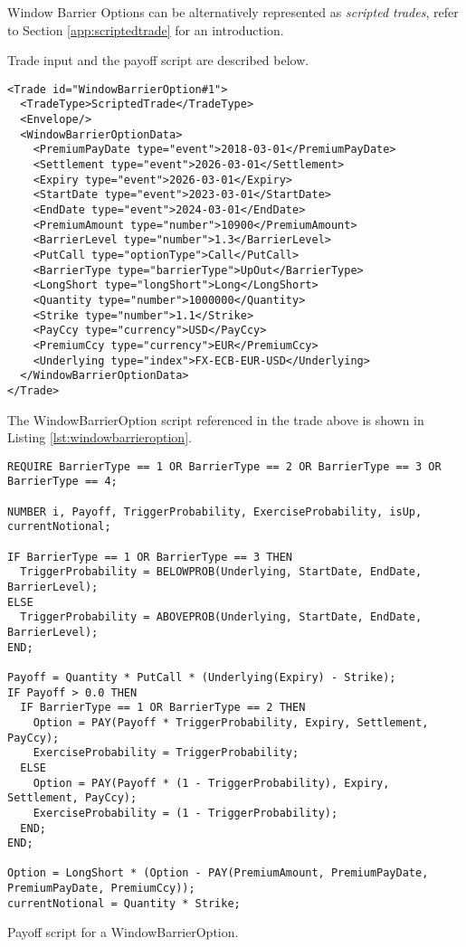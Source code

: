 
Window Barrier Options can be alternatively represented as {\em scripted trades}, refer to Section
\ref{app:scriptedtrade} for an introduction.

Trade input and the payoff script are described below.

\begin{verbatim}
<Trade id="WindowBarrierOption#1">
  <TradeType>ScriptedTrade</TradeType>
  <Envelope/>
  <WindowBarrierOptionData>
    <PremiumPayDate type="event">2018-03-01</PremiumPayDate>
    <Settlement type="event">2026-03-01</Settlement>
    <Expiry type="event">2026-03-01</Expiry>
    <StartDate type="event">2023-03-01</StartDate>
    <EndDate type="event">2024-03-01</EndDate>
    <PremiumAmount type="number">10900</PremiumAmount>
    <BarrierLevel type="number">1.3</BarrierLevel>
    <PutCall type="optionType">Call</PutCall>
    <BarrierType type="barrierType">UpOut</BarrierType>
    <LongShort type="longShort">Long</LongShort>
    <Quantity type="number">1000000</Quantity>
    <Strike type="number">1.1</Strike>
    <PayCcy type="currency">USD</PayCcy>
    <PremiumCcy type="currency">EUR</PremiumCcy>
    <Underlying type="index">FX-ECB-EUR-USD</Underlying>
  </WindowBarrierOptionData>
</Trade>
\end{verbatim}

The WindowBarrierOption script referenced in the trade above is
shown in Listing \ref{lst:windowbarrieroption}.

\begin{listing}[hbt]
\begin{verbatim}
REQUIRE BarrierType == 1 OR BarrierType == 2 OR BarrierType == 3 OR BarrierType == 4;

NUMBER i, Payoff, TriggerProbability, ExerciseProbability, isUp, currentNotional;

IF BarrierType == 1 OR BarrierType == 3 THEN
  TriggerProbability = BELOWPROB(Underlying, StartDate, EndDate, BarrierLevel);
ELSE
  TriggerProbability = ABOVEPROB(Underlying, StartDate, EndDate, BarrierLevel);
END;

Payoff = Quantity * PutCall * (Underlying(Expiry) - Strike);
IF Payoff > 0.0 THEN
  IF BarrierType == 1 OR BarrierType == 2 THEN
    Option = PAY(Payoff * TriggerProbability, Expiry, Settlement, PayCcy);
    ExerciseProbability = TriggerProbability;
  ELSE
    Option = PAY(Payoff * (1 - TriggerProbability), Expiry, Settlement, PayCcy);
    ExerciseProbability = (1 - TriggerProbability);
  END;
END;

Option = LongShort * (Option - PAY(PremiumAmount, PremiumPayDate, PremiumPayDate, PremiumCcy));
currentNotional = Quantity * Strike;
\end{verbatim}
\caption{Payoff script for a WindowBarrierOption.}
\label{lst:windowbarrieroption}
\end{listing}

